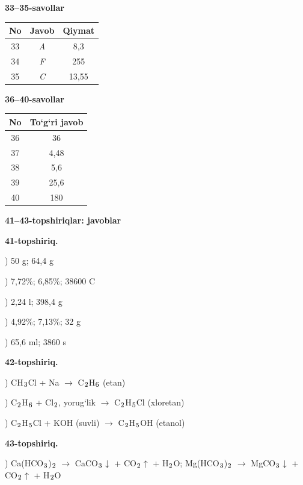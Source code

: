 \documentclass[11pt,a4paper]{article}
\renewcommand{\textsubscript}[1]{\ensuremath{_{\text{\fontsize{8}{8}\selectfont #1}}}}
\begin{document}
\noindent\textbf{33--35-savollar}\par\smallskip
\noindent\begin{tabular}{|c|c|c|}\hline \textbf{No} & \textbf{Javob} & \textbf{Qiymat}\\\hline
33 & \textsl{A} & 8,3\\\hline
34 & \textsl{F} & 255\\\hline
35 & \textsl{C} & 13,55\\\hline
\end{tabular}\par\medskip
\noindent\textbf{36--40-savollar}\par\smallskip
\noindent\begin{tabular}{|c|c|}\hline \textbf{No} & \textbf{To`g`ri javob}\\\hline
36 & 36\\\hline
37 & 4,48\\\hline
38 & 5,6\\\hline
39 & 25,6\\\hline
40 & 180\\\hline
\end{tabular}\par\medskip
\noindent\textbf{41--43-topshiriqlar: javoblar}\par\smallskip
\noindent\textbf{41-topshiriq.}\par
{}) 50 g; 64,4 g\par
{}) 7,72\%; 6,85\%; 38600 C\par
{}) 2,24 l; 398,4 g\par
{}) 4,92\%; 7,13\%; 32 g\par
{}) 65,6 ml; 3860 s\par
\noindent\textbf{42-topshiriq.}\par
{}) CH\textsubscript{3}Cl + Na $\to$ C\textsubscript{2}H\textsubscript{6} (etan)\par
{}) C\textsubscript{2}H\textsubscript{6} + Cl\textsubscript{2}, yorug`lik $\to$ C\textsubscript{2}H\textsubscript{5}Cl (xloretan)\par
{}) C\textsubscript{2}H\textsubscript{5}Cl + KOH (suvli) $\to$ C\textsubscript{2}H\textsubscript{5}OH (etanol)\par
\noindent\textbf{43-topshiriq.}\par
{}) Ca(HCO\textsubscript{3})\textsubscript{2} $\to$ CaCO\textsubscript{3}$\downarrow$ + CO\textsubscript{2}$\uparrow$ + H\textsubscript{2}O; Mg(HCO\textsubscript{3})\textsubscript{2} $\to$ MgCO\textsubscript{3}$\downarrow$ + CO\textsubscript{2}$\uparrow$ + H\textsubscript{2}O\par
\end{document}
